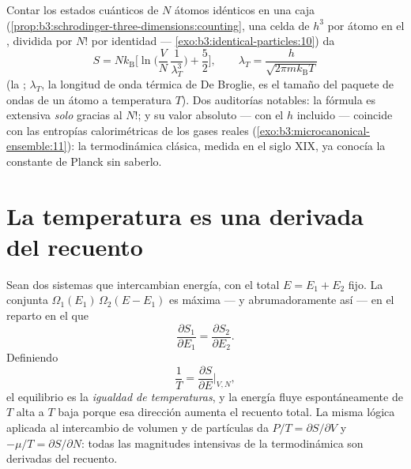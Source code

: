 \begin{proposition}\label{prop:b3:microcanonical-ensemble:gas}
Contar los estados cuánticos de $N$ átomos idénticos en una caja
(\cref{prop:b3:schrodinger-three-dimensions:counting}, una celda de
$h^3$ por átomo en el , dividida por $N!$ por identidad ---
\cref{exo:b3:identical-particles:10}) da
\[
S = Nk_{\text{B}}\Big[\ln\Big(\frac VN\,\frac1{\lambda_T^3}\Big)
 + \frac52\Big] , \qquad
\lambda_T = \frac{h}{\sqrt{2\pi mk_{\text{B}}T}}
\]
(la \emph{}; $\lambda_T$, la longitud de onda
térmica de De Broglie, es el tamaño del paquete de ondas de un átomo a
temperatura $T$). Dos auditorías notables: la fórmula es extensiva
\emph{solo} gracias al $N!$; y su valor absoluto --- con el $h$ incluido ---
coincide con las entropías calorimétricas de los gases reales
(\cref{exo:b3:microcanonical-ensemble:11}): la termodinámica clásica, medida
en el siglo XIX, ya conocía la constante de Planck sin saberlo.
\end{proposition}
\admitted

\section{La temperatura es una derivada del recuento}

\begin{theorem}\label{thm:b3:microcanonical-ensemble:temperature}
Sean dos sistemas que intercambian energía, con el total $E = E_1 + E_2$
fijo. La  conjunta $\Omega_1(E_1)\,\Omega_2(E - E_1)$ es
máxima --- y abrumadoramente así --- en el reparto en el que
\[
\frac{\partial S_1}{\partial E_1} =
\frac{\partial S_2}{\partial E_2} .
\]
Definiendo
\[
\frac1T = \frac{\partial S}{\partial E}\bigg|_{V,N} ,
\]
el equilibrio es la \emph{igualdad de temperaturas}, y la energía fluye
espontáneamente de $T$ alta a $T$ baja porque esa dirección
aumenta el recuento total. La misma lógica aplicada al intercambio de
volumen y de partículas da $P/T = \partial S/\partial V$ y $-\mu/T
= \partial S/\partial N$: todas las magnitudes intensivas de la
termodinámica son derivadas del recuento.
\end{theorem}

